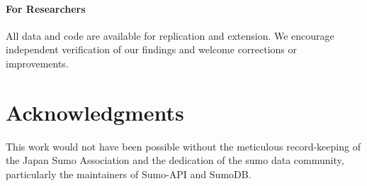 \paragraph{For Researchers} All data and code are available for replication and extension. We encourage independent verification of our findings and welcome corrections or improvements.

\section*{Acknowledgments}

This work would not have been possible without the meticulous record-keeping of the Japan Sumo Association and the dedication of the sumo data community, particularly the maintainers of Sumo-API and SumoDB.